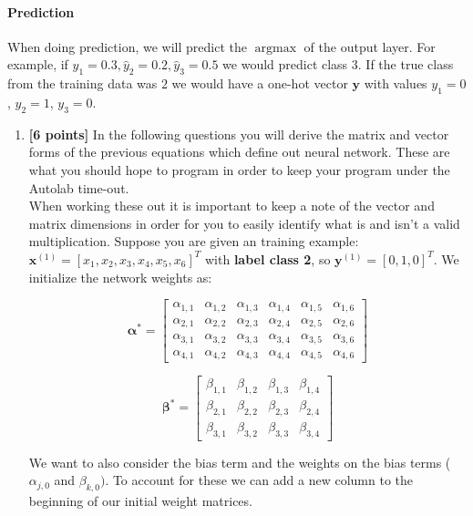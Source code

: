 \documentclass[11pt]{article}
\numberwithin{equation}{section} %
\numberwithin{figure}{section} %
\numberwithin{table}{section} %
\newcommand{\xv}{\mathbf{x}}
\newcommand{\yv}{\mathbf{y}}
\newcommand{\points}[1]{{\bf [#1 points]}}
\newcommand \argmax {\operatorname*{argmax}}
\begin{document}
\paragraph{Prediction}
When doing prediction, we will predict the $\argmax$ of the output layer. For example, if $\hat{y}_1=0.3, \hat{y}_2=0.2, \hat{y}_3=0.5$ we would predict class 3. If the true class from the training data was $2$ we would have a one-hot vector $\yv$ with values $y_1=0$, $y_2=1$, $y_3=0$.
    
\begin{enumerate} 
\clearpage
\item \points{6} In the following questions you will derive the matrix and vector forms of the previous equations which define out neural network. These are what you should hope to program in order to keep your program under the Autolab time-out.\\
When working these out it is important to keep a note of the vector and matrix dimensions in order for you to easily identify what is and isn't a valid multiplication. Suppose you are given an training example: $\xv^{(1)}=[x_1,x_2,x_3,x_4,x_5,x_6]^T$ with \textbf{label class 2}, so $\yv^{(1)}=[0,1,0]^T$. We initialize the network weights as:
\begin{center}
$$\boldsymbol{\alpha^*}=
    \begin{bmatrix}
    \alpha_{1,1} & \alpha_{1,2} & \alpha_{1,3} & \alpha_{1,4} & \alpha_{1,5} & \alpha_{1,6} \\
    \alpha_{2,1} & \alpha_{2,2} & \alpha_{2,3} & \alpha_{2,4} & \alpha_{2,5} & \alpha_{2,6} \\
    \alpha_{3,1} & \alpha_{3,2} & \alpha_{3,3} & \alpha_{3,4} & \alpha_{3,5} & \alpha_{3,6} \\
    \alpha_{4,1} & \alpha_{4,2} & \alpha_{4,3} & \alpha_{4,4} & \alpha_{4,5} & \alpha_{4,6}
    \end{bmatrix}$$
    
$$\boldsymbol{\beta^*}=
    \begin{bmatrix}
    \beta_{1,1} & \beta_{1,2} & \beta_{1,3} & \beta_{1,4} \\
    \beta_{2,1} & \beta_{2,2} & \beta_{2,3} & \beta_{2,4} \\
    \beta_{3,1} & \beta_{3,2} & \beta_{3,3} & \beta_{3,4}
    \end{bmatrix}
$$
\end{center}
    
We want to also consider the bias term and the weights on the bias terms (${\alpha}_{j,0}$ and ${\beta}_{k,0})$. To account for these we can add a new column to the beginning of our initial weight matrices. 


\end{enumerate}
\end{document}
